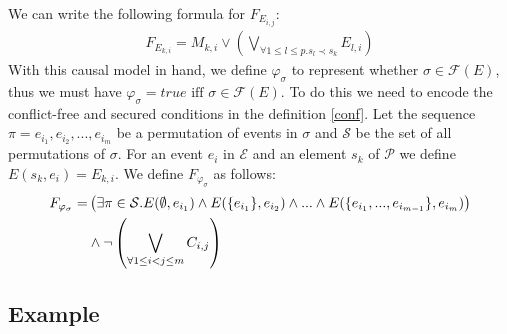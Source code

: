 \documentclass{article}
\begin{document}
We can write the following formula for $F_{E_{i,j}}$:
\begin{align*}
    F_{E_{k,i}} =
        M_{k,i} \vee
        \left(
        \bigvee_{\forall 1 \leq l \leq p. s_l \prec s_k}E_{l,i}
        \right)
\end{align*}
With this causal model in hand, we define $\varphi_{\sigma}$ to represent whether $\sigma \in \mathcal{F}(E)$,
thus we must have $\varphi_{\sigma} = true \text{ iff } \sigma \in \mathcal{F}(E)$.
To do this we need to encode the conflict-free and secured conditions in the definition \ref{conf}.
Let the sequence $\pi = e_{i_1},e_{i_2},...,e_{i_m}$ be a
permutation of events in $\sigma$ and $\mathcal{S}$ be the set of
all permutations of $\sigma$.
For an event $e_i$ in $\mathcal{E}$ and an element $s_k$ of
$\mathcal{P}$ we define $E(s_k, e_i) = E_{k,i}$.
We define $F_{\varphi_{\sigma}}$ as follows:
\begin{align*}
    F_{\varphi_{\sigma}} = &
    \left(
    \exists \pi \in \mathcal{S}. E(\emptyset, e_{i_1})
    \wedge E(\{e_{i_1}\}, e_{i_2} )
    \wedge ...
    \wedge E(\{e_{i_1},...,e_{i_{m-1}}\},e_{i_m})
    \right)                                     \\
                           & \wedge \neg \left(
    \bigvee_{\forall 1 \leq i < j \leq m } C_{i,j}
    \right)
\end{align*}

\subsection{Example}
\end{document}
